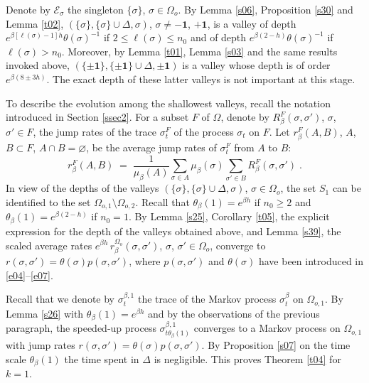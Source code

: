 \documentclass[reqno]{amsart}
\begin{document}
Denote by ${{\mathcal E}}_\sigma$ the singleton $\{\sigma\}$, $\sigma \in
\Omega_o$. By Lemma \ref{s06}, Proposition \ref{s30} and Lemma
\ref{t02}, $(\{\sigma\}, \{\sigma\}\cup \Delta, \sigma)$, $\sigma \not
= -{{\mathbf 1}}$, $+{{\mathbf 1}}$, is a valley of depth $e^{\beta [\ell(\sigma)-1]h}
\theta(\sigma)^{-1}$ if $2\le \ell(\sigma)\le n_0$ and of depth
$e^{\beta (2-h)} \theta(\sigma)^{-1}$ if $\ell(\sigma)>
n_0$. Moreover, by Lemma \ref{t01}, Lemma \ref{s03} and the same
results invoked above, $(\{\pm {{\mathbf 1}}\}, \{\pm {{\mathbf 1}}\}\cup \Delta,
\pm{{\mathbf 1}})$ is a valley whose depth is of order $e^{\beta (8\pm
  3h)}$. The exact depth of these latter valleys is not important at
this stage.

To describe the evolution among the shallowest valleys, recall the
notation introduced in Section \ref{ssec2}. For a subset $F$ of
$\Omega$, denote by $R^F_\beta (\sigma, \sigma')$, $\sigma$,
$\sigma'\in F$, the jump rates of the trace $\sigma^F_t$ of the
process $\sigma_t$ on $F$. Let $r^{F}_\beta(A,B)$, $A$, $B\subset F$,
$A\cap B=\varnothing$, be the average jump rates of $\sigma^{F}_t$
from $A$ to $B$:
\begin{equation*}
r^{F}_\beta(A,B) \;=\; \frac{1}{\mu_\beta(A)}  \sum_{\sigma\in A} 
\mu_\beta(\sigma) \sum_{\sigma'\in B} R^{F}_\beta(\sigma, \sigma')\;.
\end{equation*}
In view of the depths of the valleys $(\{\sigma\}, \{\sigma\}\cup
\Delta, \sigma)$, $\sigma \in \Omega_o$, the set $S_1$ can be
identified to the set $\Omega_{o,1} \setminus \Omega_{o,2}$. Recall
that $\theta_\beta(1) = e^{\beta h}$ if $n_0\ge 2$ and
$\theta_\beta(1) = e^{\beta (2-h)}$ if $n_0= 1$. By Lemma \ref{s25},
Corollary \ref{t05}, the explicit expression for the depth of the
valleys obtained above, and Lemma \ref{s39}, the scaled average rates
$e^{\beta h} \, r_\beta^{\Omega_o} (\sigma,\sigma')$, $\sigma$,
$\sigma'\in \Omega_o$, converge to $r(\sigma, \sigma') =
\theta(\sigma) p(\sigma, \sigma')$, where $p(\sigma, \sigma')$ and
$\theta(\sigma)$ have been introduced in \eqref{e04}--\eqref{e07}.

Recall that we denote by $\sigma^{\beta,1}_t$ the trace of the Markov
process $\sigma^{\beta}_t$ on $\Omega_{o,1}$. By Lemma \ref{s26} with
$\theta_\beta(1) = e^{\beta h}$ and by the observations of the
previous paragraph, the speeded-up process $\sigma^{\beta,1}_{t
  \theta_\beta(1)}$ converges to a Markov process on $\Omega_{o,1}$
with jump rates $r(\sigma, \sigma') = \theta(\sigma) p(\sigma,
\sigma')$. By Proposition \ref{s07} on the time scale
$\theta_\beta(1)$ the time spent in $\Delta$ is negligible.  This
proves Theorem \ref{t04} for $k=1$.
\end{document}
